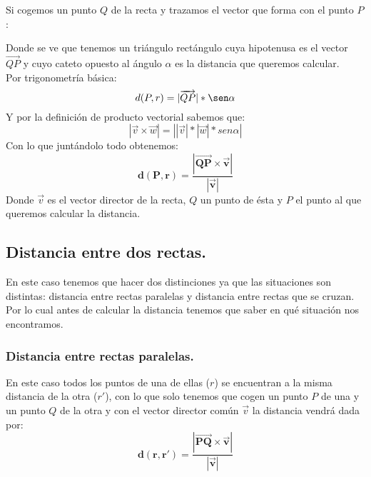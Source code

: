 \documentclass[a4paper,11pt,answers]{exam}
\begin{document}
Si cogemos un punto $Q$ de la recta y trazamos el vector que forma con el punto $P$:
\begin{center}
  \end{center}
Donde se ve que tenemos un triángulo rectángulo cuya hipotenusa es el vector $\overrightarrow{QP}$ y cuyo cateto opuesto al ángulo $\alpha$ es la distancia que queremos calcular.\\
Por trigonometría básica:
\[d(P,r)=|\overrightarrow{QP}|*\sen \alpha\]
Y por la definición de producto vectorial sabemos que:
\[|\vec v \times \vec w| = \left||\vec v|*|\vec w|*sen \alpha
\right|\]
Con lo que juntándolo todo obtenemos:
\[\boldsymbol{d(P, r) = \frac{\left|\overrightarrow{QP}\times \vec v \right|}{|\vec v|}}\]
Donde $\vec v$ es el vector director de la recta, $Q$ un punto de ésta y $P$ el punto al que queremos calcular la distancia.

\subsection{Distancia entre dos rectas.}
En este caso tenemos que hacer dos distinciones ya que las situaciones son distintas: distancia entre rectas paralelas y distancia entre rectas que se cruzan.\\
Por lo cual antes de calcular la distancia tenemos que saber en qué situación nos encontramos.
\subsubsection{Distancia entre rectas paralelas.}
En este caso todos los puntos de una de ellas ($r$) se encuentran a la misma distancia de la otra ($r'$), con lo que solo tenemos que cogen un punto $P$ de una y un punto $Q$ de la otra y con el vector director común $\vec v$ la distancia vendrá dada por:
\[\boldsymbol{d(r,r') = \frac{\left|\overrightarrow{PQ}\times \vec v \right|}{|\vec v|}}\]
\end{document}
